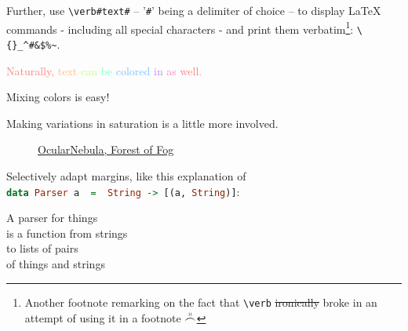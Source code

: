 Further, use \verb`\verb#text#` -- '\texttt{\#}' being a delimiter of choice -- to display {\LaTeX} commands - including all special characters \fbox{\textbackslash\{\}\_\^{}\#\&\$\%\~{}} - and print them verbatim\renewcommand{\thefootnote}{$\star$}\footnote{Another footnote remarking on the fact that \texttt{\textbackslash verb} \sout{ironically} broke in an attempt of using it in a footnote $\overset\shortparallel\frown$}: \verb`\{}_^#&$%~`.

\medskip
\textcolor[HTML]{FF7F7F}{Naturally,}
\textcolor[HTML]{FFBF7F}{text}
\textcolor[HTML]{BFFF7F}{can}
\textcolor[HTML]{7FFFBF}{be}
\textcolor[HTML]{7FBFFF}{colored}
\textcolor[HTML]{BF7FFF}{in}
\textcolor[HTML]{FF7FBF}{as}
\textcolor[HTML]{FF7F7F}{well.}

\textcolor{-pagecol}{Mixing} colors is \textcolor{yellow!75!red}{easy!}

\textcolor{BLU!![0]}{Making}
\textcolor{BLU!![12]}{variations}
\textcolor{BLU!![25]}{in}
\textcolor{BLU!![37]}{saturation}
\textcolor{BLU!![50]}{is}
\textcolor{BLU!![62]}{a}
\textcolor{BLU!![75]}{little}
\textcolor{BLU!![87]}{more}
\colorbox{pagecol!75!black}{
	\textcolor{BLU!![100]}{involved.}
}%

\begin{figure}
	\hypertarget{thelink}{}
	\color{cyan!50!blue!80!black!75!white}
	\captionsetup{font=tiny}
	\caption*{\href{https://www.newgrounds.com/audio/listen/522338}{OcularNebula, Forest of Fog}}
	\label{fig:diamond}
\end{figure}

\medskip
Selectively adapt margins, like this explanation of 
\\ \lstinline[language=Haskell]{data Parser a  =  String -> [(a, String)]}:
\vfill
\begin{addmargin}[2cm]{1cm}
	A parser for things \\
	is a function from strings \\
	to lists of pairs \\
	of things and strings
\end{addmargin}
\vfill

